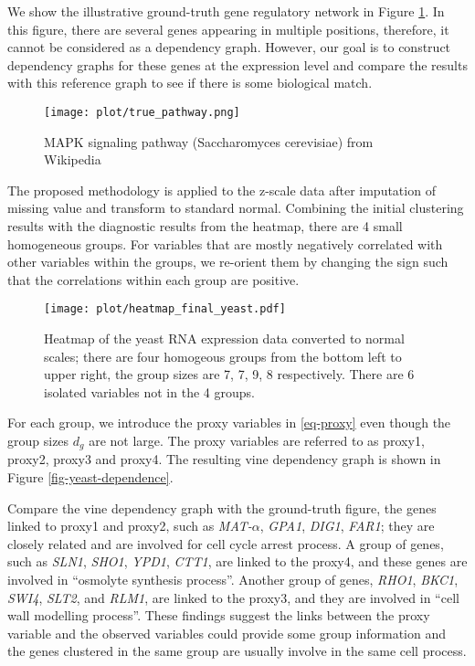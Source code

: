 \documentclass[a4paper]{article}
\begin{document}
We show the illustrative ground-truth gene regulatory network in Figure \ref{fig-yeast-truth}. In this figure, there are several genes appearing in multiple positions, therefore, it cannot be considered as a dependency graph.
However, our goal is to construct dependency graphs for these genes at the expression level and compare the results with this reference graph to see if there is some biological match.

\begin{figure}[h!]
\texttt{[image: plot/true\_pathway.png]}
\caption{MAPK signaling pathway (Saccharomyces cerevisiae) from Wikipedia}
\label{fig-yeast-truth}

\end{figure}

The proposed methodology %
is applied to the z-scale data after imputation
of missing value and transform to standard normal. 
Combining the initial clustering results with the diagnostic results from the heatmap, there are 4 small homogeneous groups. %
For variables that are mostly negatively correlated with other variables within the groups, we re-orient them by changing the sign such that the correlations within each group are positive. 

\begin{figure}[h!]
\centering
\texttt{[image: plot/heatmap\_final\_yeast.pdf]}
\caption{Heatmap of the yeast RNA expression data converted to normal scales; there are four homogeous groups from the bottom left to upper right, the group sizes are 7, 7, 9, 8 respectively. There are 6 isolated variables
not in the 4 groups.}
\label{fig-heatmap-yeast}
\end{figure}
For each group, we introduce the proxy variables in \eqref{eq-proxy}
even though the group sizes $d_g$ are not large.
The proxy variables are referred to as proxy1, proxy2, proxy3 and proxy4.
The resulting vine dependency graph is shown in Figure \ref{fig-yeast-dependence}.

Compare the vine dependency graph with the ground-truth figure, the
genes linked to proxy1 and proxy2, such as \textit{MAT-$\alpha$},
\textit{GPA1}, \textit{DIG1}, \textit{FAR1}; they are closely related
and are involved for cell cycle arrest process.  A group of genes,
such as \textit{SLN1}, \textit{SHO1}, \textit{YPD1}, \textit{CTT1},
are linked to the proxy4, and these genes are involved in ``osmolyte
synthesis process''.  Another group of genes, \textit{RHO1},
\textit{BKC1}, \textit{SWI4}, \textit{SLT2}, and \textit{RLM1}, are
linked to the proxy3, and they are involved in ``cell wall modelling
process''.  These findings suggest the links between the proxy
variable and the observed variables could provide some group
information and the genes clustered in the same group are usually
involve in the same cell process.
\end{document}
